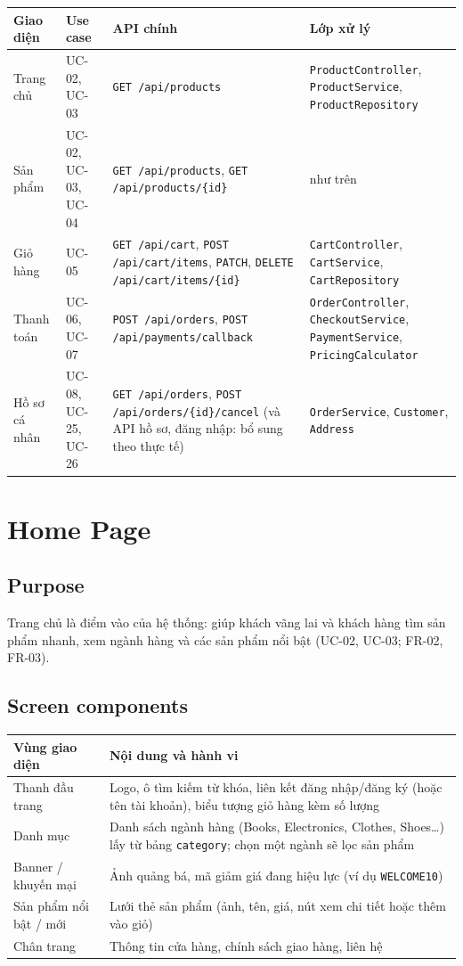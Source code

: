 \documentclass[12pt,a4paper,oneside]{report}
\begin{document}
\begin{longtable}{@{}>{\raggedright\arraybackslash}p{2.8cm}>{\raggedright\arraybackslash}p{2.6cm}>{\raggedright\arraybackslash}p{4.6cm}>{\raggedright\arraybackslash}p{5.2cm}@{}}
\toprule
\textbf{Giao diện} & \textbf{Use case} & \textbf{API chính} & \textbf{Lớp xử lý} \\
\midrule
\endhead
Trang chủ & UC-02, UC-03 & \texttt{GET /api/products} & \texttt{ProductController}, \texttt{ProductService}, \texttt{ProductRepository} \\
Sản phẩm & UC-02, UC-03, UC-04 & \texttt{GET /api/products}, \texttt{GET /api/products/\{id\}} & như trên \\
Giỏ hàng & UC-05 & \texttt{GET /api/cart}, \texttt{POST /api/cart/items}, \texttt{PATCH}, \texttt{DELETE /api/cart/items/\{id\}} & \texttt{CartController}, \texttt{CartService}, \texttt{CartRepository} \\
Thanh toán & UC-06, UC-07 & \texttt{POST /api/orders}, \texttt{POST /api/payments/callback} & \texttt{OrderController}, \texttt{CheckoutService}, \texttt{PaymentService}, \texttt{PricingCalculator} \\
Hồ sơ cá nhân & UC-08, UC-25, UC-26 & \texttt{GET /api/orders}, \texttt{POST /api/orders/\{id\}/cancel} (và API hồ sơ, đăng nhập: bổ sung theo thực tế) & \texttt{OrderService}, \texttt{Customer}, \texttt{Address} \\
\bottomrule
\end{longtable}

\section{Home Page}

\subsection{Purpose}
Trang chủ là điểm vào của hệ thống: giúp khách vãng lai và khách hàng tìm sản phẩm nhanh, xem ngành hàng và các sản phẩm nổi bật (UC-02, UC-03; FR-02, FR-03).

\subsection{Screen components}
\begin{longtable}{@{}p{3.6cm}p{11.8cm}@{}}
\toprule
\textbf{Vùng giao diện} & \textbf{Nội dung và hành vi} \\
\midrule
\endhead
Thanh đầu trang & Logo, ô tìm kiếm từ khóa, liên kết đăng nhập/đăng ký (hoặc tên tài khoản), biểu tượng giỏ hàng kèm số lượng \\
Danh mục & Danh sách ngành hàng (Books, Electronics, Clothes, Shoes\ldots) lấy từ bảng \texttt{category}; chọn một ngành sẽ lọc sản phẩm \\
Banner / khuyến mại & Ảnh quảng bá, mã giảm giá đang hiệu lực (ví dụ \texttt{WELCOME10}) \\
Sản phẩm nổi bật / mới & Lưới thẻ sản phẩm (ảnh, tên, giá, nút xem chi tiết hoặc thêm vào giỏ) \\
Chân trang & Thông tin cửa hàng, chính sách giao hàng, liên hệ \\
\bottomrule
\end{longtable}
\end{document}
